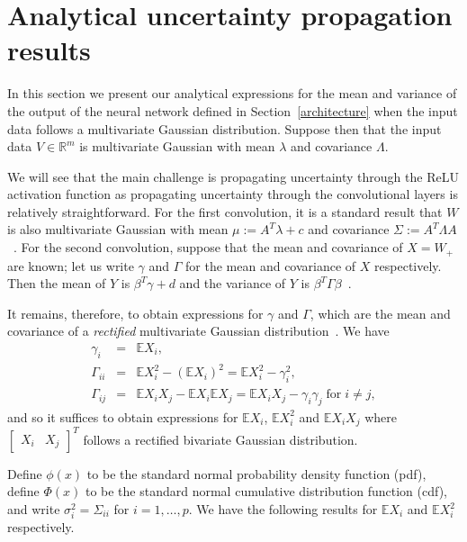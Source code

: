 \documentclass{article}
\newcommand{\RR}{\mathbb{R}}
\begin{document}
\section{Analytical uncertainty propagation results}\label{analytical_results}

In this section we present our analytical expressions for the mean and variance of the output of the neural network defined in Section~\ref{architecture} when the input data follows a multivariate Gaussian distribution. Suppose then that the input data $V\in\RR^m$ is multivariate Gaussian with mean $\lambda$ and covariance $\Lambda$. 


We will see that the main challenge is propagating uncertainty through the ReLU activation function as propagating uncertainty through the convolutional layers is relatively straightforward. For the first convolution, it is a standard result that $W$ is also multivariate Gaussian with mean $\mu:=A^T\lambda+c$ and covariance $\Sigma:=A^T\Lambda A$~\cite[Result 13.2]{johnson2002applied}. For the second convolution, suppose that the mean and covariance of $X=W_+$ are known; let us write $\gamma$ and $\Gamma$ for the mean and covariance of $X$ respectively. Then the mean of $Y$ is $\beta^T \gamma + d$ and the variance of $Y$ is $\beta^T \Gamma \beta$~\cite[Equation 2-43]{johnson2002applied}. 

It remains, therefore, to obtain expressions for $\gamma$ and $\Gamma$, which are the mean and covariance of a \emph{rectified} multivariate Gaussian distribution~\cite{kan2017moments}. We have
$$\begin{array}{rcl}\gamma_i &=& \mathbb{E} X_i,\\ \Gamma_{ii} &=& \mathbb{E} X_i^2 - (\mathbb{E} X_i)^2 = \mathbb{E} X_i^2 - \gamma_i^2,\\
\Gamma_{ij} &=& \mathbb{E} X_i X_j - \mathbb{E} X_i \mathbb{E} X_j = \mathbb{E} X_i X_j - \gamma_i \gamma_j\;\textrm{for}\;i\neq j,\end{array}$$ and so it suffices to obtain expressions for $\mathbb{E} X_i$, $\mathbb{E} X_i^2$ and $\mathbb{E} X_i X_j$ where $\begin{bmatrix}X_i&X_j\end{bmatrix}^T$ follows a rectified bivariate Gaussian distribution.

Define $\phi(x)$ to be the standard normal probability density function (pdf), define $\Phi(x)$ to be the standard normal cumulative distribution function (cdf), and write $\sigma^2_i=\Sigma_{ii}$ for $i=1,\ldots,p$. We have the following results for $\mathbb{E} X_i$ and $\mathbb{E} X_i^2$ respectively.
\end{document}
